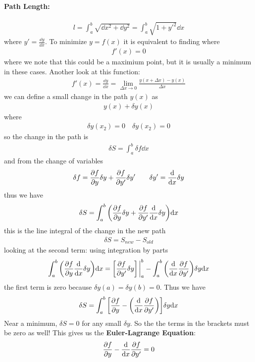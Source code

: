 \documentclass[../main.tex]{subfiles}
\begin{document}
\paragraph*{Path Length:}
\begin{align*}
    l = \int_a^b \sqrt{\dd x^2 + \dd y^2} = \int_a^b \sqrt{1 + y'^2} \dd x
\end{align*}
where $y' = \frac{\dd y}{\dd x}$. To minimize $y = f(x)$ it is equivalent to finding where
\begin{align*}
    f'(x) = 0
\end{align*}
where we note that this could be a maximium point, but it is usually a minimum in these cases.
Another look at this function:
\begin{align*}
    f'(x) = \frac{\dd y}{\dd x} = \lim_{\Delta x \to 0} \frac{y(x + \Delta x) - y(x)}{\Delta x}
\end{align*}
we can define a small change in the path $y(x)$ as
\begin{align*}
    y(x) + \delta y(x)
\end{align*}
where 
\begin{align*}
    \delta y(x_2) = 0 \quad \delta y(x_2) = 0
\end{align*}
so the change in the path is
\begin{align*}
    \delta S = \int_a^b \delta f \dd x
\end{align*}
and from the change of variables
\begin{align*}
    \delta f = \pdv{f}{y} \delta y + \pdv{f}{y'} \delta y' \qquad \delta y' = \dv{x} \delta y
\end{align*}
thus we have
\begin{align*}
    \delta S = \int_a^b \qt( \pdv{f}{y} \delta y + \pdv{f}{y'} \dv{x} \delta y) \dd x
\end{align*}
this is the line integral of the change in the new path
\begin{align*}
    \delta S = S_{new} - S_{old}
\end{align*}
looking at the second term: using integration by parts
\begin{align*}
    \int_a^b \qt(\pdv{f}{y} \dv{x} \delta y) \dd x = \qt[\pdv{f}{y'} \delta y]\eval_a^b
        - \int_a^b \qt(\dv{x} \pdv{f}{y'}) \delta y \dd x 
\end{align*}
the first term is zero because $\delta y(a) = \delta y(b) = 0$. Thus we have
\begin{align*}
    \delta S = \int_a^b \qt[\pdv{f}{y} - \qt(\dv{x} \pdv{f}{y'})] \delta y \dd x
\end{align*}
Near a minimum, $\delta S = 0$ for any small $\delta y$. So the the terms in the brackets must be
zero as well! This gives us the \textbf{Euler-Lagrange Equation}:
\begin{align*}
    \pdv{f}{y} - \dv{x} \pdv{f}{y'} = 0
\end{align*}
\end{document}
